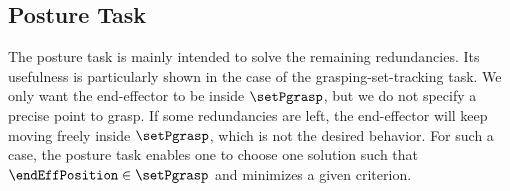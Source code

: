 	
	\subsection{Posture Task}
	The posture task is mainly intended to solve the remaining redundancies. Its usefulness is particularly shown in the case of the grasping-set-tracking task. We only want the end-effector to be inside $\setPgrasp$, but we do not specify a precise point to grasp. If some redundancies are left, the end-effector will keep moving freely inside $\setPgrasp$, which is not the desired behavior. For such a case, the posture task enables one to choose one solution such that $\endEffPosition\in\setPgrasp$ and minimizes a given criterion. %
	
